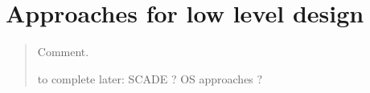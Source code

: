 \documentclass{template/openetcs_article}
\begin{document}
\newenvironment{issue}{
	\begin{quote}
	\begin{itshape}Open Issue. 
}{
	\end{itshape}
	\end{quote}
}

\newenvironment{comment}{
	\begin{quote}
	\begin{itshape}Comment. 
}{
	\end{itshape}
	\end{quote}
}

\newenvironment{justif}{
	\begin{quote}
	\begin{itshape}Justification. 
}{
	\end{itshape}
	\end{quote}
}


\def\reqt{R-WP2/D2.3.0}















\section{Approaches for low level design}

\begin{comment}
to  complete later: SCADE ? OS approaches ?
\end{comment}


\nocite{*}








\end{document}
